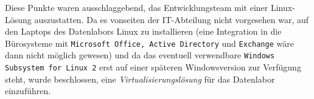 Diese Punkte waren ausschlaggebend, das Entwicklungsteam mit einer Linux-Lösung auszustatten. Da es vonseiten der IT-Abteilung nicht vorgesehen war, auf den Laptops des Datenlabors Linux zu installieren (eine Integration in die Bürosysteme mit \texttt{Microsoft Office, Active Directory} und \texttt{Exchange} wäre dann nicht möglich gewesen) und da das eventuell verwendbare \texttt{Windows Subsystem for Linux 2} erst auf einer späteren Windowsversion zur Verfügung steht, wurde beschlossen, eine \textit{Virtualisierungslösung} für das Datenlabor einzuführen.


